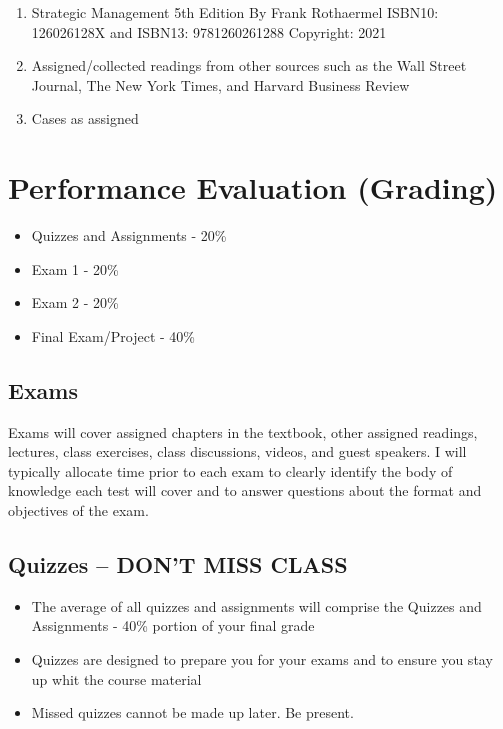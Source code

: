 \documentclass[
]{book}
\providecommand{\tightlist}{%
  \setlength{\itemsep}{0pt}\setlength{\parskip}{0pt}}
\begin{document}
\begin{enumerate}
\def\labelenumi{\arabic{enumi}.}
\tightlist
\item
  Strategic Management 5th Edition By Frank Rothaermel ISBN10: 126026128X and ISBN13: 9781260261288
  Copyright: 2021
\item
  Assigned/collected readings from other sources such as the Wall Street Journal, The New York Times, and Harvard Business Review
\item
  Cases as assigned
\end{enumerate}

\hypertarget{performance-evaluation-grading}{%
\section{Performance Evaluation (Grading)}\label{performance-evaluation-grading}}

\begin{itemize}
\tightlist
\item
  Quizzes and Assignments - 20\%
\item
  Exam 1 - 20\%
\item
  Exam 2 - 20\%
\item
  Final Exam/Project - 40\%
\end{itemize}

\hypertarget{exams}{%
\subsection{Exams}\label{exams}}

Exams will cover assigned chapters in the textbook, other assigned readings, lectures, class exercises, class discussions, videos, and guest speakers. I will typically allocate time prior to each exam to clearly identify the body of knowledge each test will cover and to answer questions about the format and objectives of the exam.

\hypertarget{quizzes-dont-miss-class}{%
\subsection{\texorpdfstring{Quizzes -- \textbf{DON'T MISS CLASS}}{Quizzes -- DON'T MISS CLASS}}\label{quizzes-dont-miss-class}}

\begin{itemize}
\tightlist
\item
  The average of all quizzes and assignments will comprise the Quizzes and Assignments - 40\% portion of your final grade
\item
  Quizzes are designed to prepare you for your exams and to ensure you stay up whit the course material
\item
  Missed quizzes cannot be made up later. Be present.
\end{itemize}
\end{document}

